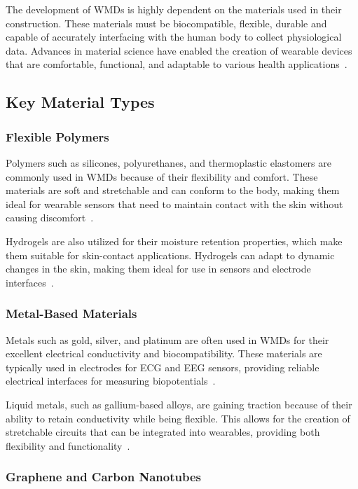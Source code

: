 \documentclass[journal]{IEEEtran}
\begin{document}
The development of WMDs is highly dependent on the materials used in their construction. These materials must be biocompatible, flexible, durable and capable of accurately interfacing with the human body to collect physiological data. Advances in material science have enabled the creation of wearable devices that are comfortable, functional, and adaptable to various health applications~\cite{Luo2024}.

    \subsection{Key Material Types}

        \subsubsection{Flexible Polymers}

        Polymers such as silicones, polyurethanes, and thermoplastic elastomers are commonly used in WMDs because of their flexibility and comfort. These materials are soft and stretchable and can conform to the body, making them ideal for wearable sensors that need to maintain contact with the skin without causing discomfort~\cite{Trovato2022}.

        Hydrogels are also utilized for their moisture retention properties, which make them suitable for skin-contact applications. Hydrogels can adapt to dynamic changes in the skin, making them ideal for use in sensors and electrode interfaces~\cite{Trovato2022}.

        \subsubsection{Metal-Based Materials}

        Metals such as gold, silver, and platinum are often used in WMDs for their excellent electrical conductivity and biocompatibility. These materials are typically used in electrodes for ECG and EEG sensors, providing reliable electrical interfaces for measuring biopotentials~\cite{Kim2017}.

        Liquid metals, such as gallium-based alloys, are gaining traction because of their ability to retain conductivity while being flexible. This allows for the creation of stretchable circuits that can be integrated into wearables, providing both flexibility and functionality~\cite{Lu2020}.

        \subsubsection{Graphene and Carbon Nanotubes}
\end{document}
